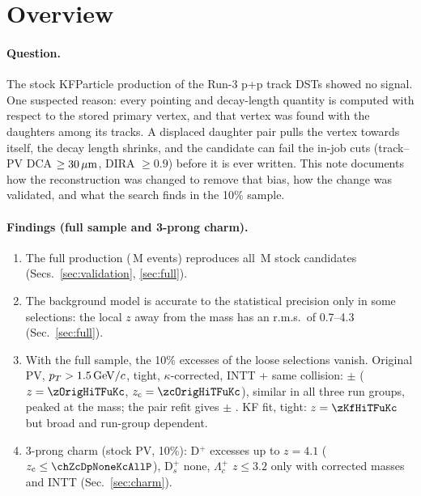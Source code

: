 \section{Overview}
\label{sec:overview}

\paragraph{Question.} The stock KFParticle \Dzero{} production of the Run-3 p+p track DSTs showed no \Dzero{} signal.
One suspected reason: every pointing and decay-length quantity is computed with respect to the stored primary vertex,
and that vertex was found with the \Dzero{} daughters among its tracks. A displaced daughter pair pulls the vertex towards
itself, the decay length shrinks, and the candidate can fail the in-job cuts (track--PV DCA $\geq 30\,\mu\mathrm{m}$, DIRA
$\geq 0.9$) before it is ever written. This note documents how the reconstruction was changed to remove that bias,
how the change was validated, and what the \Dzero{} search finds in the 10\% sample.

\paragraph{Findings (full sample and 3-prong charm).}
\begin{enumerate}
\item The full \Dzero{} production (\eventsAll\,M events) reproduces all \candAllStock\,M stock candidates
  (Secs.~\ref{sec:validation}, \ref{sec:full}).
\item The background model is accurate to the statistical precision only in some selections: the local $z$ away from
  the \Dzero{} mass has an r.m.s.\ of 0.7--4.3 (Sec.~\ref{sec:full}).
\item With the full sample, the 10\% excesses of the loose selections vanish. Original PV, $p_T>1.5\,\mathrm{GeV}/c$, tight,
  $\kappa$-corrected, INTT + same collision: \exOrigHiTFuKc{} $\pm$ \eexOrigHiTFuKc{} ($z=\zOrigHiTFuKc$,
  $z_{\rm c}=\zcOrigHiTFuKc$), similar in all three run groups, peaked at the \Dzero{} mass; the pair refit gives
  \exPairHiTFuKc{} $\pm$ \eexPairHiTFuKc. KF fit, tight: $z=\zKfHiTFuKc$ but broad and run-group dependent.
\item 3-prong charm (stock PV, 10\%): D$^+$ excesses up to $z=4.1$ ($z_{\rm c}\leq\chZcDpNoneKcAllP$), D$_s^+$ none,
  $\Lambda_c^+$ $z\leq3.2$ only with corrected masses and INTT (Sec.~\ref{sec:charm}).
\end{enumerate}

